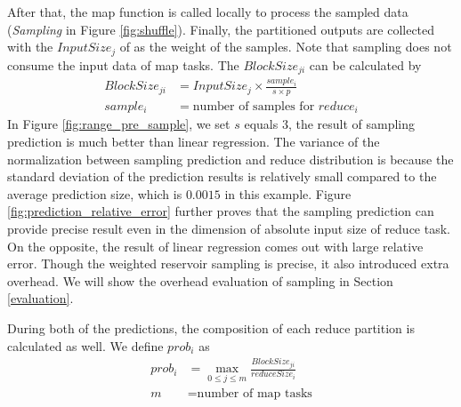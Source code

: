 \ifrevision
\reversemarginpar
{}
\fi
{}
After that, the map function is called locally to process the sampled data (\textit{Sampling} in Figure \ref{fig:shuffle}). 
Finally, the partitioned outputs are collected with the $InputSize_j$ of as the weight of the samples.
Note that sampling does not consume the input data of map tasks. 
The $BlockSize_{ji}$ can be calculated by
\begin{equation}
\label{equationsample}
\begin{aligned}
	BlockSize_{ji} &= {{InputSize_j \times \frac{sample_i}{s \times p}}} \\
	sample_i &= \text{number of samples for $reduce_i$}
\end{aligned}
\end{equation}
In Figure \ref{fig:range_pre_sample}, we set $s$ equals $3$, the result of sampling prediction is much better than linear regression. 
The variance of the normalization between sampling prediction and reduce distribution is because the standard deviation of the prediction results is relatively small compared to the average prediction size, which is $0.0015$ in this example. 
Figure \ref{fig:prediction_relative_error} further proves that the sampling prediction can provide precise result even in the dimension of absolute input size of reduce task. 
On the opposite, the result of linear regression comes out with large relative error. 
Though the weighted reservoir sampling is precise, it also introduced extra overhead. 
We will show the overhead evaluation of sampling in Section \ref{evaluation}.

During both of the predictions, the composition of each reduce partition is calculated as well. We define $prob_i$ as
\begin{equation}
\label{equationprob}
\begin{aligned}
	prob_i &= \max_{0 \leq j \leq m} \frac{BlockSize_{ji}}{reduceSize_i} \\
    m &= \text{number of map tasks}
\end{aligned}
\end{equation}

